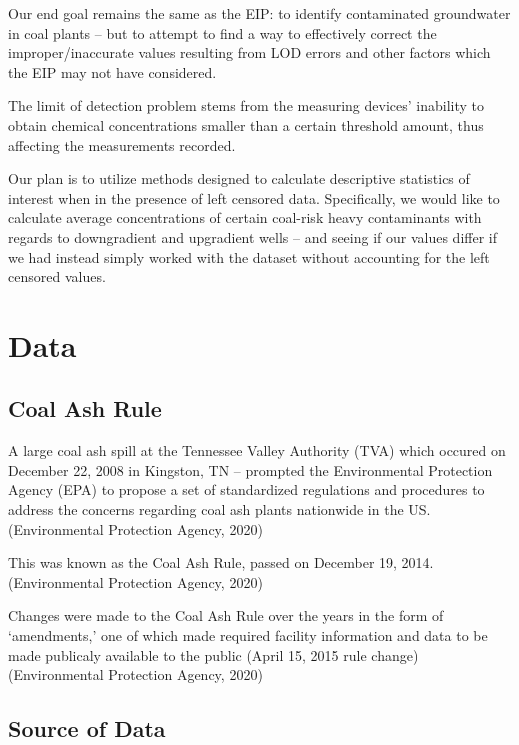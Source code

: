\documentclass[12pt, twoside]{amherstthesis}
\begin{document}
Our end goal remains the same as the EIP: to identify contaminated groundwater in coal plants -- but to attempt to find a way to effectively correct the improper/inaccurate values resulting from LOD errors and other factors which the EIP may not have considered.

The limit of detection problem stems from the measuring devices' inability to obtain chemical concentrations smaller than a certain threshold amount, thus affecting the measurements recorded.

Our plan is to utilize methods designed to calculate descriptive statistics of interest when in the presence of left censored data. Specifically, we would like to calculate average concentrations of certain coal-risk heavy contaminants with regards to downgradient and upgradient wells -- and seeing if our values differ if we had instead simply worked with the dataset without accounting for the left censored values.

\hypertarget{data}{%
\section{Data}\label{data}}

\hypertarget{coalashrule}{%
\subsection{Coal Ash Rule}\label{coalashrule}}

A large coal ash spill at the Tennessee Valley Authority (TVA) which occured on December 22, 2008 in Kingston, TN -- prompted the Environmental Protection Agency (EPA) to propose a set of standardized regulations and procedures to address the concerns regarding coal ash plants nationwide in the US. (Environmental Protection Agency, 2020)

This was known as the Coal Ash Rule, passed on December 19, 2014. (Environmental Protection Agency, 2020)

Changes were made to the Coal Ash Rule over the years in the form of `amendments,' one of which made required facility information and data to be made publicaly available to the public (April 15, 2015 rule change) (Environmental Protection Agency, 2020)

\hypertarget{source-of-data}{%
\subsection{Source of Data}\label{source-of-data}}
\end{document}
